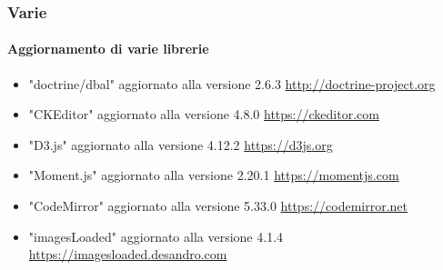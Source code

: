 \begin{frame}[fragile]
	\frametitle{Varie}
	\framesubtitle{Aggiornamento di varie librerie}

	\begin{itemize}
		\item "doctrine/dbal" aggiornato alla versione 2.6.3\newline
			\smaller
				\href{http://doctrine-project.org}{http://doctrine-project.org}
			\normalsize

		\item "CKEditor" aggiornato alla versione 4.8.0\newline
			\smaller
				\href{https://ckeditor.com}{https://ckeditor.com}
			\normalsize

		\item "D3.js" aggiornato alla versione 4.12.2\newline
			\smaller
				\href{https://d3js.org}{https://d3js.org}
			\normalsize

		\item "Moment.js" aggiornato alla versione 2.20.1\newline
			\smaller
				\href{https://momentjs.com}{https://momentjs.com}
			\normalsize

		\item "CodeMirror" aggiornato alla versione 5.33.0\newline
			\smaller
				\href{https://codemirror.net}{https://codemirror.net}
			\normalsize

		\item "imagesLoaded" aggiornato alla versione 4.1.4\newline
			\smaller
				\href{https://imagesloaded.desandro.com}{https://imagesloaded.desandro.com}
			\normalsize

	\end{itemize}

\end{frame}

